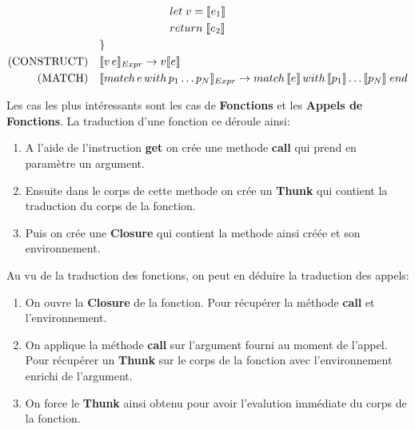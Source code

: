 \documentclass[12pt]{article}
\begin{document}
\begin{align*}
                               & \quad \quad \quad \quad \quad \quad \; let \; v = \llbracket e_1 \rrbracket                                                                                                                                          \\
                               & \quad \quad \quad \quad \quad \quad \; return \;\llbracket e_2 \rrbracket                                                                                                                                            \\
                               & \}                                                                                                                                                                             \\
      \text{(CONSTRUCT)} \quad & \llbracket v \, e \rrbracket_{Expr} \rightarrow v\llbracket e \rrbracket                                                                                                                  \\
      \text{(MATCH)} \quad     & \llbracket match \, e \, with \, p_1 \dots p_N  \rrbracket_{Expr}\rightarrow  match \, \llbracket e \rrbracket \, with \, \llbracket p_1 \rrbracket \dots \llbracket p_N \rrbracket \; end        \\
\end{align*}

Les cas les plus intéressants sont les cas de \textbf{Fonctions} et les \textbf{Appels de Fonctions}.
La traduction d'une fonction ce déroule ainsi:
\begin{enumerate}
      \tightlist
      \item
            A l'aide de l'instruction \textbf{get} on crée une methode \textbf{call} qui prend en paramètre un argument.
      \item
            Ensuite dans le corps de cette methode on crée un \textbf{Thunk} qui contient la traduction du corps de la fonction.
      \item
            Puis on crée une \textbf{Closure} qui contient la methode ainsi créée et son environnement.
\end{enumerate}
Au vu de la traduction des fonctions, on peut en déduire la traduction des appels:
\begin{enumerate}
      \tightlist
      \item
            On ouvre la \textbf{Closure} de la fonction.
            Pour récupérer la méthode \textbf{call} et l'environnement.
      \item
            On applique la méthode \textbf{call} sur l'argument fourni au moment de l'appel.
            Pour récupérer un \textbf{Thunk} sur le corps de la fonction  avec l'environnement enrichi de l'argument.
      \item
            On force le \textbf{Thunk} ainsi obtenu pour avoir l'evalution immédiate du corps de la fonction.
\end{enumerate}
\end{document}
